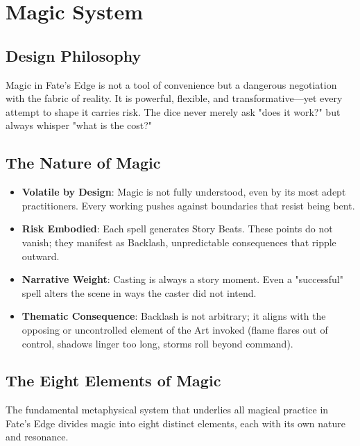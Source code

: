 \chapter{Magic System}

\section{Design Philosophy}

Magic in Fate's Edge is not a tool of convenience but a dangerous negotiation with the fabric of reality. It is powerful, flexible, and transformative---yet every attempt to shape it carries risk. The dice never merely ask "does it work?" but always whisper "what is the cost?"

\section{The Nature of Magic}

\begin{itemize}
\item \textbf{Volatile by Design}: Magic is not fully understood, even by its most adept practitioners. Every working pushes against boundaries that resist being bent.
\item \textbf{Risk Embodied}: Each spell generates Story Beats. These points do not vanish; they manifest as Backlash, unpredictable consequences that ripple outward.
\item \textbf{Narrative Weight}: Casting is always a story moment. Even a "successful" spell alters the scene in ways the caster did not intend.
\item \textbf{Thematic Consequence}: Backlash is not arbitrary; it aligns with the opposing or uncontrolled element of the Art invoked (flame flares out of control, shadows linger too long, storms roll beyond command).
\end{itemize}

\section{The Eight Elements of Magic}

The fundamental metaphysical system that underlies all magical practice in Fate's Edge divides magic into eight distinct elements, each with its own nature and resonance.

